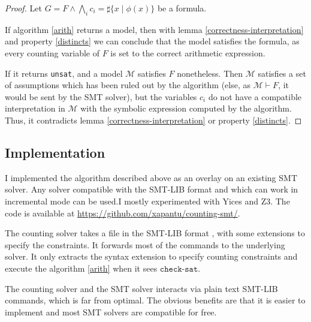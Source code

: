 \begin{proof}
Let $G = F \land \bigwedge\limits_{i} c_i = \sharp\{x\mid\phi(x)\}$ be a formula.

If algorithm \ref{arith} returns a model, then with lemma \ref{correctness-interpretation} and property
\ref{distincts} we can conclude that the model satisfies the formula, as every counting variable of
$F$ is set to the correct arithmetic expression.

If it returns \texttt{unsat}, and a model $\mathcal{M}$ satisfies $F$ nonetheless. Then $\mathcal{M}$
satisfies a set of assumptions which has been ruled out by the algorithm (else, as $\mathcal{M}
\vdash F$, it would be sent by the SMT solver), but the variables $c_i$ do not have a compatible
interpretation in $\mathcal{M}$ with the symbolic expression computed by the algorithm. Thus, it
contradicts lemma \ref{correctness-interpretation} or property \ref{distincts}.
\end{proof}

\subsection{Implementation}

I implemented the algorithm described above as an overlay on an existing SMT solver. Any solver
compatible with the SMT-LIB format \cite{barrett2010smt} and which can work in incremental mode can
be used.I mostly experimented with Yices and Z3. The code is available at
\url{https://github.com/xapantu/counting-smt/}.

The counting solver takes a file in the SMT-LIB format \cite{barrett2010smt}, with some extensions
to specify the constraints. It forwards most of the commands to the underlying solver. It only
extracts the syntax extension to specify counting constraints and execute the algorithm \ref{arith}
when it sees $\texttt{check-sat}$.

The counting solver and the SMT solver interacts via plain text SMT-LIB  commands, which is far from
optimal. The obvious benefits are that it is easier to implement and most SMT solvers are compatible
for free.
